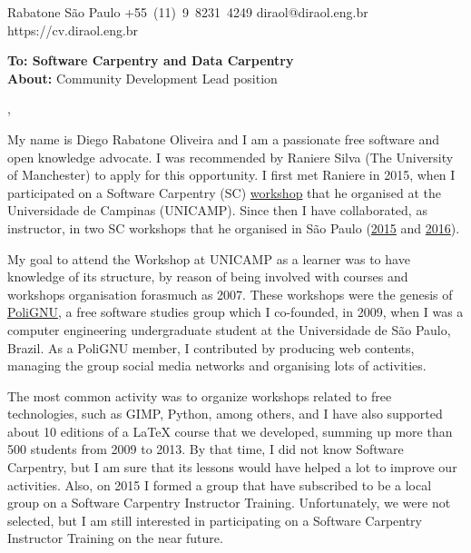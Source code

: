 \documentclass[11pt]{friggeri-cover-letter}
\begin{document}
\thispagestyle{empty}
       {Rabatone}
       {}
       {São Paulo}
       {}
       {+55~(11)~9~8231~4249}
       {diraol@diraol.eng.br}
       {https://cv.diraol.eng.br}

\textbf{To: Software Carpentry and Data Carpentry}\\
\textbf{About:} Community Development Lead position\\

\vfill

,

\vfill

My name is Diego Rabatone Oliveira and I am a passionate free software and open
knowledge advocate.
%
I was recommended by Raniere Silva (The University of Manchester) to apply for
this opportunity.
%
I first met Raniere in 2015, when I participated on a Software Carpentry (SC)
\href{https://rgaiacs.github.io/2015-06-04-unicamp/}{workshop} that he
organised at the Universidade de Campinas (UNICAMP).
%
Since then I have collaborated, as instructor, in two SC workshops that he
organised in São Paulo (\href{https://rgaiacs.github.io/2015-09-10-usp/}{2015}
and \href{https://rgaiacs.github.io/2016-05-27-ccsl/}{2016}).


My goal to attend the Workshop at UNICAMP as a learner was to have knowledge of
its structure, by reason of being involved with courses and workshops
organisation forasmuch as 2007.
%
These workshops were the genesis of \href{https://polignu.org}{PoliGNU}, a free
software studies group which I co-founded, in 2009, when I was a computer
engineering undergraduate student at the Universidade de São Paulo, Brazil.
%
As a PoliGNU member, I contributed by producing web contents, managing the
group social media networks and organising lots of activities.

\vfill

The most common activity was to organize workshops related to free
technologies, such as GIMP, Python, among others, and I have also supported
about 10 editions of a LaTeX course that we developed, summing up more than 500
students from 2009 to 2013.
%
By that time, I did not know Software Carpentry, but I am sure that its lessons
would have helped a lot to improve our activities.
%
Also, on 2015 I formed a group that have subscribed to be a local group on a
Software Carpentry Instructor Training.
%
Unfortunately, we were not selected, but I am still interested in participating
on a Software Carpentry Instructor Training on the near future.
%
\end{document}

